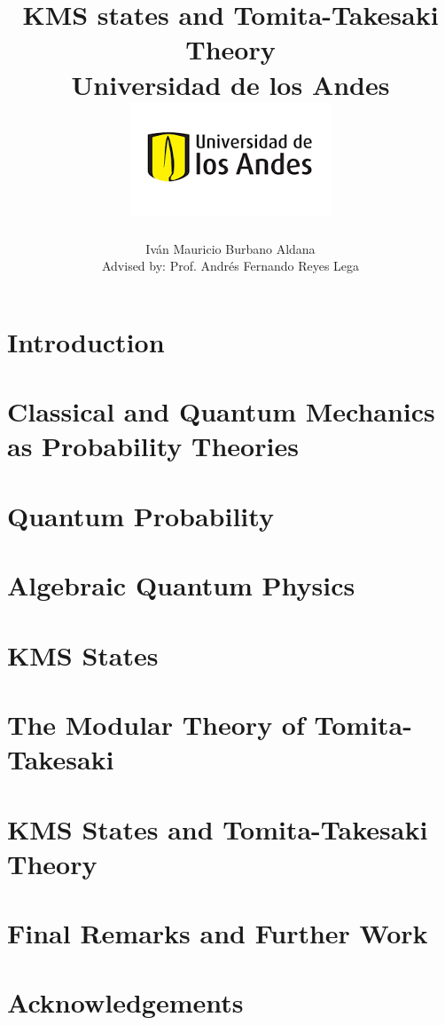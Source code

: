 \documentclass[12pt]{report}
\title 
{
	{KMS states and Tomita-Takesaki Theory}\\
	{\large Universidad de los Andes}\\
	{\includegraphics{logo.png}}	
}
\author{Iván Mauricio Burbano Aldana\\[1cm]{\small Advised by: Prof. Andrés Fernando Reyes Lega}}
\theoremstyle{definition}
\begin{document}

\maketitle

\tableofcontents

\chapter{Introduction}


\chapter{Classical and Quantum Mechanics as Probability Theories}\label{chp:axiom}


\chapter{Quantum Probability}\label{chp:logic}


\chapter{Algebraic Quantum Physics}\label{chp:algebra}


\chapter{KMS States}\label{chp:KMS}


\chapter{The Modular Theory of Tomita-Takesaki}\label{chp:tomita}


\chapter{KMS States and Tomita-Takesaki Theory}\label{chp:final}


\chapter{Final Remarks and Further Work}


\chapter{Acknowledgements}




\end{document}
